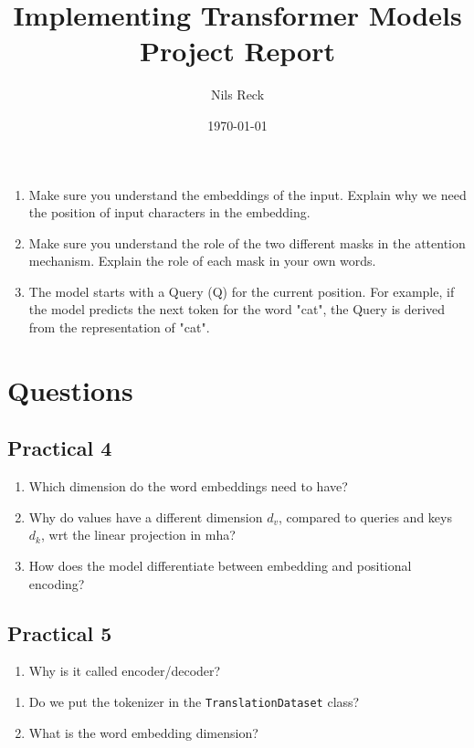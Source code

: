 \documentclass{article}
\title{Implementing Transformer Models \\
       Project Report
      }
\author{Nils Reck}
\date{\today}
\begin{document}
\maketitle







\begin{enumerate}
	\item Make sure you understand the embeddings of the input. Explain why we need the position of input characters in the embedding.
	\item Make sure you understand the role of the two different masks in the attention mechanism. Explain the role of each mask in your own words.
	\item The model starts with a Query (Q) for the current position. For example, if the model predicts the next token for the word "cat", the Query is derived from the representation of "cat".
\end{enumerate}

\section{Questions}
\subsection{Practical 4}
\begin{enumerate}
	\item Which dimension do the word embeddings need to have?
	\item Why do values have a different dimension \(d_v\), compared to queries and keys \(d_k \), wrt the linear projection in mha?
    \item How does the model differentiate between embedding and positional encoding?
\end{enumerate}
\subsection{Practical 5}
\begin{enumerate}
	\item Why is it called encoder/decoder?
\end{enumerate}
\begin{enumerate}
	\item Do we put the tokenizer in the \lstinline{TranslationDataset} class?
	\item What is the word embedding dimension?
\end{enumerate}
\end{document}

